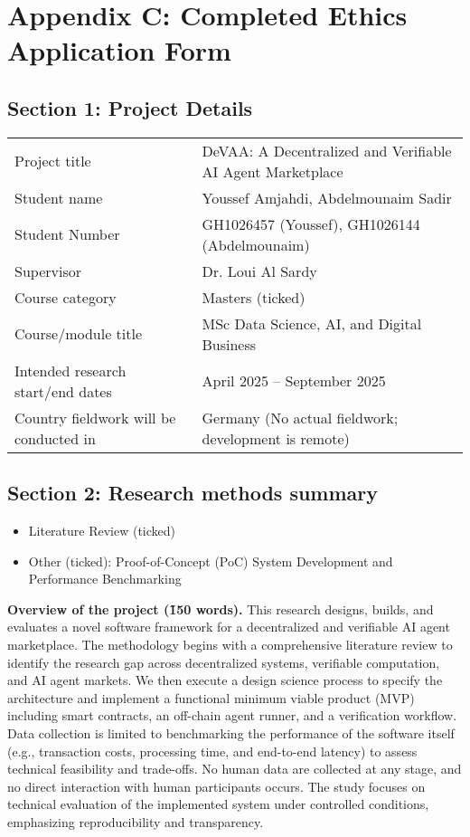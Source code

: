 ﻿\chapter{Appendix C: Completed Ethics Application Form}
\label{appendix:ethics}

\section*{Section 1: Project Details}
\begin{longtable}{p{}p{}}
Project title & DeVAA: A Decentralized and Verifiable AI Agent Marketplace \\
Student name & Youssef Amjahdi, Abdelmounaim Sadir \\
Student Number & GH1026457 (Youssef), GH1026144 (Abdelmounaim) \\
Supervisor & Dr. Loui Al Sardy \\
Course category & Masters (ticked) \\
Course/module title & MSc Data Science, AI, and Digital Business \\
Intended research start/end dates & April 2025 -- September 2025 \\
Country fieldwork will be conducted in & Germany (No actual fieldwork; development is remote) \\
\end{longtable}

\section*{Section 2: Research methods summary}
\begin{itemize}
  \item Literature Review (ticked)
  \item Other (ticked): Proof-of-Concept (PoC) System Development and Performance Benchmarking
\end{itemize}
\textbf{Overview of the project (\~150 words).} This research designs, builds, and evaluates a novel software framework for a decentralized and verifiable AI agent marketplace. The methodology begins with a comprehensive literature review to identify the research gap across decentralized systems, verifiable computation, and AI agent markets. We then execute a design science process to specify the architecture and implement a functional minimum viable product (MVP) including smart contracts, an off-chain agent runner, and a verification workflow. Data collection is limited to benchmarking the performance of the software itself (e.g., transaction costs, processing time, and end-to-end latency) to assess technical feasibility and trade-offs. No human data are collected at any stage, and no direct interaction with human participants occurs. The study focuses on technical evaluation of the implemented system under controlled conditions, emphasizing reproducibility and transparency.

